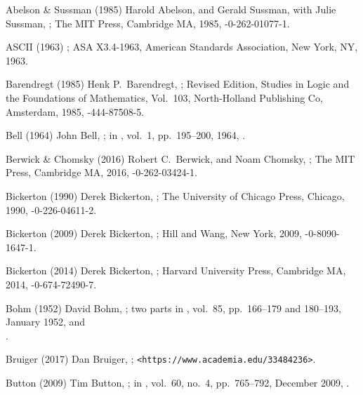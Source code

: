 

\biblabel Abelson \& Sussman (1985)
Harold Abelson, and Gerald Sussman, with Julie Sussman,
;
The MIT Press, Cambridge MA, 1985,
-0-262-01077-1.

\biblabel ASCII (1963)
;
ASA X3.4-1963,
American Standards Association, New York, NY, 1963.

\biblabel Barendregt (1985)
Henk P.\ Barendregt,
;
Revised Edition, Studies in Logic and the Foundations of Mathematics,
Vol.\ 103, North-Holland Publishing Co, Amsterdam, 1985,
-444-87508-5.

\biblabel Bell (1964)
John Bell,
;
in ,
vol.\ 1, pp.\ 195--200, 1964,
.

\biblabel Berwick \& Chomsky (2016)
Robert C.\ Berwick, and Noam Chomsky,
;
The MIT Press, Cambridge MA, 2016,
-0-262-03424-1.

\biblabel Bickerton (1990)
Derek Bickerton,
;
The University of Chicago Press, Chicago, 1990,
-0-226-04611-2.

\biblabel Bickerton (2009)
Derek Bickerton,
;
Hill and Wang, New York, 2009,
-0-8090-1647-1.

\biblabel Bickerton (2014)
Derek Bickerton,
;
Harvard University Press, Cambridge MA, 2014,
-0-674-72490-7.

\biblabel Bohm (1952)
David Bohm,
; two parts
in ,
vol.\ 85, pp.\ 166--179 and 180--193, January 1952,
 and\\
.

\biblabel Bruiger (2017)
Dan Bruiger,
;
{\tt \URL <https://www.academia.edu/33484236>}.

\biblabel Button (2009)
Tim Button,
;
in ,
vol.\ 60, no.\ 4, pp.\ 765--792, December 2009,
.

